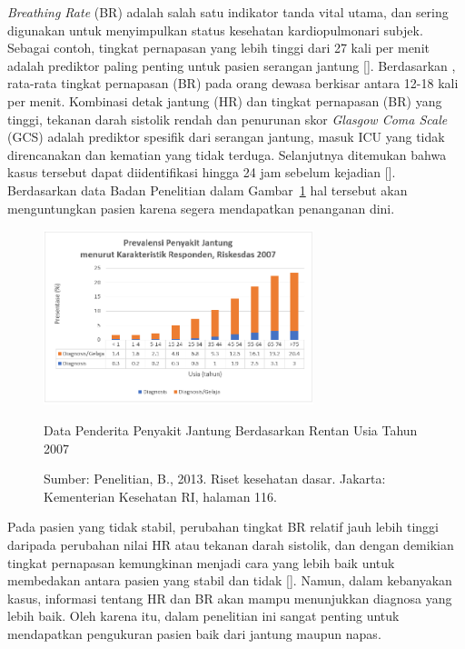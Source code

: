  \textit{Breathing Rate} (BR) adalah salah satu indikator tanda vital utama, dan sering digunakan untuk menyimpulkan status kesehatan kardiopulmonari subjek. Sebagai contoh, tingkat pernapasan yang lebih tinggi dari 27 kali per menit adalah prediktor paling penting untuk pasien serangan jantung [\citet{fieselmann1993}]. Berdasarkan \citet{Ganong}, rata-rata tingkat pernapasan (BR) pada orang dewasa berkisar antara 12-18 kali per menit. Kombinasi detak jantung (HR) dan tingkat pernapasan (BR) yang tinggi, tekanan darah sistolik rendah dan penurunan skor \textit{Glasgow Coma Scale} (GCS) adalah prediktor spesifik dari serangan jantung, masuk ICU yang tidak direncanakan dan kematian yang tidak terduga. Selanjutnya ditemukan bahwa kasus tersebut dapat diidentifikasi hingga 24 jam sebelum kejadian [\citet{cretikos2007}]. Berdasarkan data Badan Penelitian \citep{RI2013} dalam Gambar~\ref{fig:data_penyakit_jantung} hal tersebut akan menguntungkan pasien karena segera mendapatkan penanganan dini.

\begin{figure}[ht]
\vspace{0.5em}
\centering
 \includegraphics[width=0.7\textwidth]{chart_penderita_jantung}
 \caption{Data Penderita Penyakit Jantung Berdasarkan Rentan Usia Tahun 2007}
 \caption*{Sumber: Penelitian, B., 2013. Riset kesehatan dasar. Jakarta: Kementerian Kesehatan RI, halaman 116.}
 \label{fig:data_penyakit_jantung}   
\end{figure}


Pada pasien yang tidak stabil, perubahan tingkat BR relatif jauh lebih tinggi daripada perubahan nilai HR atau tekanan darah sistolik, dan dengan demikian tingkat pernapasan kemungkinan menjadi cara yang lebih baik untuk membedakan antara pasien yang stabil dan tidak [\citet{subbe2003}]. Namun, dalam kebanyakan kasus, informasi tentang HR dan BR akan mampu menunjukkan diagnosa yang lebih baik. Oleh karena itu, dalam penelitian ini sangat penting untuk mendapatkan pengukuran pasien  baik dari jantung maupun napas.


